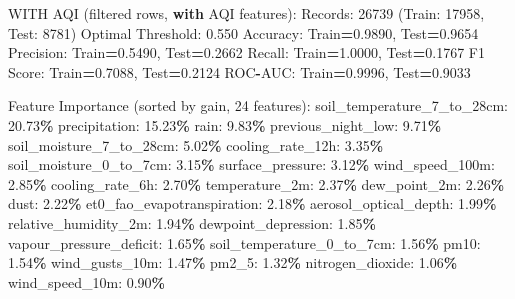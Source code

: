 \documentclass[
  letterpaper,
  DIV=11,
  numbers=noendperiod]{scrartcl}
\newenvironment{Shaded}{\begin{snugshade}}{\end{snugshade}}
\newcommand{\BuiltInTok}[1]{#1}
\newcommand{\ControlFlowTok}[1]{\textcolor[rgb]{0.13,0.29,0.53}{\textbf{#1}}}
\newcommand{\DecValTok}[1]{\textcolor[rgb]{0.00,0.00,0.81}{#1}}
\newcommand{\FloatTok}[1]{\textcolor[rgb]{0.00,0.00,0.81}{#1}}
\newcommand{\NormalTok}[1]{#1}
\newcommand{\OperatorTok}[1]{\textcolor[rgb]{0.81,0.36,0.00}{\textbf{#1}}}
\begin{document}
\begin{Shaded}
\begin{Highlighting}[]
\NormalTok{WITH AQI (filtered rows, }\ControlFlowTok{with}\NormalTok{ AQI features):}
\NormalTok{  Records: }\DecValTok{26739}\NormalTok{ (Train: }\DecValTok{17958}\NormalTok{, Test: }\DecValTok{8781}\NormalTok{)}
\NormalTok{  Optimal Threshold: }\FloatTok{0.550}
\NormalTok{  Accuracy: Train}\OperatorTok{=}\FloatTok{0.9890}\NormalTok{, Test}\OperatorTok{=}\FloatTok{0.9654}
\NormalTok{  Precision: Train}\OperatorTok{=}\FloatTok{0.5490}\NormalTok{, Test}\OperatorTok{=}\FloatTok{0.2662}
\NormalTok{  Recall: Train}\OperatorTok{=}\FloatTok{1.0000}\NormalTok{, Test}\OperatorTok{=}\FloatTok{0.1767}
\NormalTok{  F1 Score: Train}\OperatorTok{=}\FloatTok{0.7088}\NormalTok{, Test}\OperatorTok{=}\FloatTok{0.2124}
\NormalTok{  ROC}\OperatorTok{{-}}\NormalTok{AUC: Train}\OperatorTok{=}\FloatTok{0.9996}\NormalTok{, Test}\OperatorTok{=}\FloatTok{0.9033}

\NormalTok{  Feature Importance (}\BuiltInTok{sorted}\NormalTok{ by gain, }\DecValTok{24}\NormalTok{ features):}
\NormalTok{    soil\_temperature\_7\_to\_28cm: }\FloatTok{20.73}\OperatorTok{\%}
\NormalTok{    precipitation: }\FloatTok{15.23}\OperatorTok{\%}
\NormalTok{    rain: }\FloatTok{9.83}\OperatorTok{\%}
\NormalTok{    previous\_night\_low: }\FloatTok{9.71}\OperatorTok{\%}
\NormalTok{    soil\_moisture\_7\_to\_28cm: }\FloatTok{5.02}\OperatorTok{\%}
\NormalTok{    cooling\_rate\_12h: }\FloatTok{3.35}\OperatorTok{\%}
\NormalTok{    soil\_moisture\_0\_to\_7cm: }\FloatTok{3.15}\OperatorTok{\%}
\NormalTok{    surface\_pressure: }\FloatTok{3.12}\OperatorTok{\%}
\NormalTok{    wind\_speed\_100m: }\FloatTok{2.85}\OperatorTok{\%}
\NormalTok{    cooling\_rate\_6h: }\FloatTok{2.70}\OperatorTok{\%}
\NormalTok{    temperature\_2m: }\FloatTok{2.37}\OperatorTok{\%}
\NormalTok{    dew\_point\_2m: }\FloatTok{2.26}\OperatorTok{\%}
\NormalTok{    dust: }\FloatTok{2.22}\OperatorTok{\%}
\NormalTok{    et0\_fao\_evapotranspiration: }\FloatTok{2.18}\OperatorTok{\%}
\NormalTok{    aerosol\_optical\_depth: }\FloatTok{1.99}\OperatorTok{\%}
\NormalTok{    relative\_humidity\_2m: }\FloatTok{1.94}\OperatorTok{\%}
\NormalTok{    dewpoint\_depression: }\FloatTok{1.85}\OperatorTok{\%}
\NormalTok{    vapour\_pressure\_deficit: }\FloatTok{1.65}\OperatorTok{\%}
\NormalTok{    soil\_temperature\_0\_to\_7cm: }\FloatTok{1.56}\OperatorTok{\%}
\NormalTok{    pm10: }\FloatTok{1.54}\OperatorTok{\%}
\NormalTok{    wind\_gusts\_10m: }\FloatTok{1.47}\OperatorTok{\%}
\NormalTok{    pm2\_5: }\FloatTok{1.32}\OperatorTok{\%}
\NormalTok{    nitrogen\_dioxide: }\FloatTok{1.06}\OperatorTok{\%}
\NormalTok{    wind\_speed\_10m: }\FloatTok{0.90}\OperatorTok{\%}


\end{Highlighting}
\end{Shaded}
\end{document}
